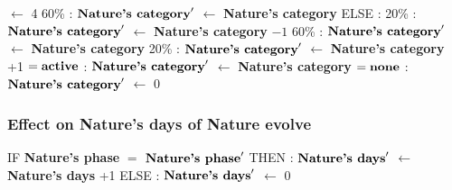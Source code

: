 \documentclass{article}%
\begin{document}
\begin{flushleft}
$\leftarrow$%
4%
\linebreak%
\hspace*{10em}%
60\%%
: %
$\mbox{\textbf{Nature's category}} '$%
$\leftarrow$%
\textbf{Nature's category}%
\linebreak%
\hspace*{8em}%
ELSE %
: %
\linebreak%
\hspace*{10em}%
20\%%
: %
$\mbox{\textbf{Nature's category}} '$%
$\leftarrow$%
\textbf{Nature's category}%
${-}1$%
\linebreak%
\hspace*{10em}%
60\%%
: %
$\mbox{\textbf{Nature's category}} '$%
$\leftarrow$%
\textbf{Nature's category}%
\linebreak%
\hspace*{10em}%
20\%%
: %
$\mbox{\textbf{Nature's category}} '$%
$\leftarrow$%
\textbf{Nature's category}%
+1%
\linebreak%
\hspace*{2em}%
$= \mbox{\textbf{active}}$%
: %
$\mbox{\textbf{Nature's category}} '$%
$\leftarrow$%
\textbf{Nature's category}%
\linebreak%
\hspace*{2em}%
$= \mbox{\textbf{none}}$%
: %
$\mbox{\textbf{Nature's category}} '$%
$\leftarrow$%
0%
\end{flushleft}

%
\subsubsection{Effect on Nature's days of Nature evolve}%
\label{ssubsec:Effect on Nature's days of Nature evolve}%
\begin{flushleft}%
IF %
\textbf{Nature's phase}%
$=$%
$\mbox{\textbf{Nature's phase}} '$%
\linebreak%
\hspace*{2em}%
THEN %
: %
$\mbox{\textbf{Nature's days}} '$%
$\leftarrow$%
\textbf{Nature's days}%
+1%
\linebreak%
\hspace*{2em}%
ELSE %
: %
$\mbox{\textbf{Nature's days}} '$%
$\leftarrow$%
0%
\end{flushleft}

%
\end{document}
